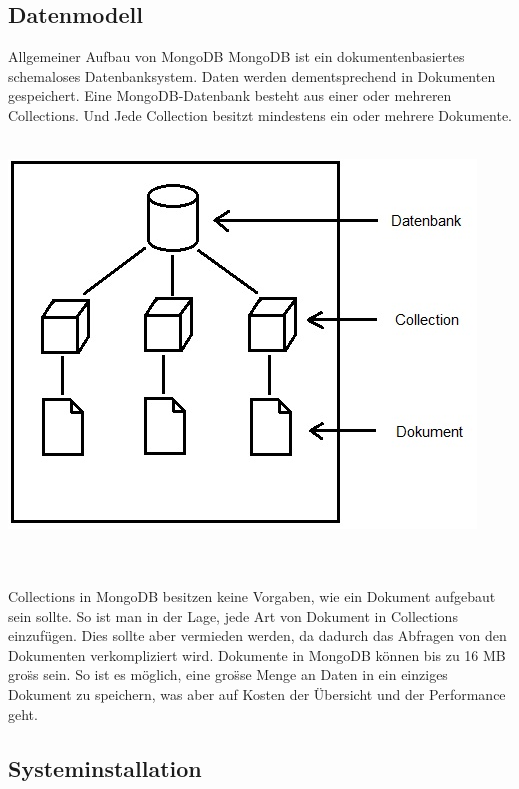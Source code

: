 \subsection{Datenmodell}
Allgemeiner Aufbau von MongoDB
MongoDB ist ein dokumentenbasiertes schemaloses Datenbanksystem. Daten werden dementsprechend in Dokumenten gespeichert. Eine MongoDB-Datenbank besteht aus einer oder mehreren Collections. Und Jede Collection besitzt mindestens ein oder mehrere Dokumente. 
\\
\\
\begin{minipage}{\textwidth}
    \centering
    \includegraphics[scale=0.3]{images/01_Datenmodell_Mongo.jpg}
    \label{fig:ver}
\end{minipage}
\\
\\
Collections in MongoDB besitzen keine Vorgaben, wie ein Dokument aufgebaut sein sollte. So ist man in der Lage, jede Art von Dokument in Collections einzuf\"ugen. Dies sollte aber vermieden werden, da dadurch das Abfragen von den Dokumenten verkompliziert wird. Dokumente in MongoDB k\"onnen bis zu 16 MB gro\"ss sein. So ist es m\"oglich, eine gro\"sse Menge an Daten in ein einziges Dokument zu speichern, was aber auf Kosten der \"Ubersicht und der Performance geht.
\subsection{Systeminstallation}
